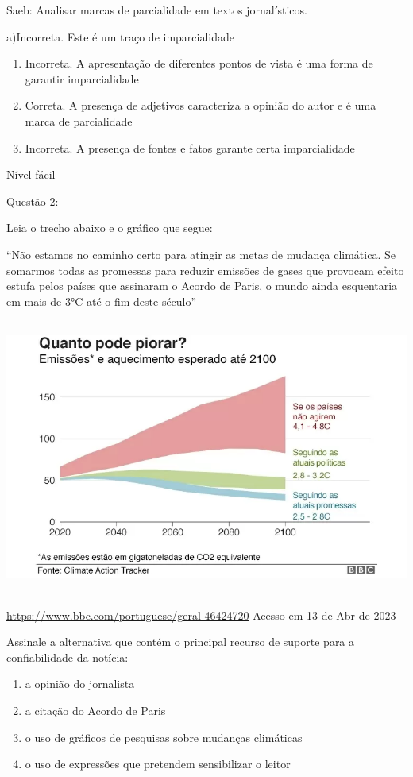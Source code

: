 {Saeb: Analisar marcas de parcialidade em textos jornalísticos.

a)Incorreta. Este é um traço de imparcialidade

\begin{enumerate}
\def\labelenumi{\arabic{enumi}.}
\item
  Incorreta. A apresentação de diferentes pontos de vista é uma forma de
  garantir imparcialidade
\item
  Correta. A presença de adjetivos caracteriza a opinião do autor e é
  uma marca de parcialidade
\item
  Incorreta. A presença de fontes e fatos garante certa imparcialidade
\end{enumerate}

Nível fácil

Questão 2:

Leia o trecho abaixo e o gráfico que segue:

``Não estamos no caminho certo para atingir as metas de mudança
climática. Se somarmos todas as promessas para reduzir emissões de gases
que provocam efeito estufa pelos países que assinaram o Acordo de Paris,
o mundo ainda esquentaria em mais de 3°C até o fim deste século''

\includegraphics[width=5.90551in,height=3.56944in]{./imgSAEB_7_POR/media/image8.png}

\href{https://www.bbc.com/portuguese/geral-46424720}{\uline{https://www.bbc.com/portuguese/geral-46424720}}
Acesso em 13 de Abr de 2023

Assinale a alternativa que contém o principal recurso de suporte para a
confiabilidade da notícia:

\begin{enumerate}
\def\labelenumi{\alph{enumi})}
\item
  a opinião do jornalista
\item
  a citação do Acordo de Paris
\item
  o uso de gráficos de pesquisas sobre mudanças climáticas
\item
  o uso de expressões que pretendem sensibilizar o leitor
\end{enumerate}

}
